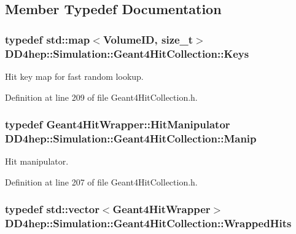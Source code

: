 \subsection{Member Typedef Documentation}
\hypertarget{class_d_d4hep_1_1_simulation_1_1_geant4_hit_collection_a0d4d87fb90cf83dceff0b43928426135}{
\subsubsection[{Keys}]{\setlength{\rightskip}{0pt plus 5cm}typedef std::map$<$VolumeID, size\_\-t$>$ {\bf DD4hep::Simulation::Geant4HitCollection::Keys}}}
\label{class_d_d4hep_1_1_simulation_1_1_geant4_hit_collection_a0d4d87fb90cf83dceff0b43928426135}


Hit key map for fast random lookup. 

Definition at line 209 of file Geant4HitCollection.h.\hypertarget{class_d_d4hep_1_1_simulation_1_1_geant4_hit_collection_a7a4b540fa0c4983ebd755a049a2794b7}{
\subsubsection[{Manip}]{\setlength{\rightskip}{0pt plus 5cm}typedef {\bf Geant4HitWrapper::HitManipulator} {\bf DD4hep::Simulation::Geant4HitCollection::Manip}}}
\label{class_d_d4hep_1_1_simulation_1_1_geant4_hit_collection_a7a4b540fa0c4983ebd755a049a2794b7}


Hit manipulator. 

Definition at line 207 of file Geant4HitCollection.h.\hypertarget{class_d_d4hep_1_1_simulation_1_1_geant4_hit_collection_ada2cbec73b2d5005b514a33b44a1dc05}{
\subsubsection[{WrappedHits}]{\setlength{\rightskip}{0pt plus 5cm}typedef std::vector$<${\bf Geant4HitWrapper}$>$ {\bf DD4hep::Simulation::Geant4HitCollection::WrappedHits}}}
\label{class_d_d4hep_1_1_simulation_1_1_geant4_hit_collection_ada2cbec73b2d5005b514a33b44a1dc05}


